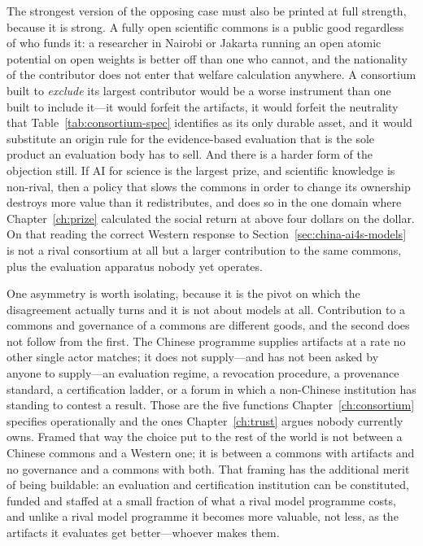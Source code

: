 The strongest version of the opposing case must also be printed at full strength, because it is strong. A fully open scientific commons is a public good regardless of who funds it: a researcher in Nairobi or Jakarta running an open atomic potential on open weights is better off than one who cannot, and the nationality of the contributor does not enter that welfare calculation anywhere. A consortium built to \emph{exclude} its largest contributor would be a worse instrument than one built to include it---it would forfeit the artifacts, it would forfeit the neutrality that Table~\ref{tab:consortium-spec} identifies as its only durable asset, and it would substitute an origin rule for the evidence-based evaluation that is the sole product an evaluation body has to sell. And there is a harder form of the objection still. If AI for science is the largest prize, and scientific knowledge is non-rival, then a policy that slows the commons in order to change its ownership destroys more value than it redistributes, and does so in the one domain where Chapter~\ref{ch:prize} calculated the social return at above four dollars on the dollar. On that reading the correct Western response to Section~\ref{sec:china-ai4s-models} is not a rival consortium at all but a larger contribution to the same commons, plus the evaluation apparatus nobody yet operates.

One asymmetry is worth isolating, because it is the pivot on which the disagreement actually turns and it is not about models at all. Contribution to a commons and governance of a commons are different goods, and the second does not follow from the first. The Chinese programme supplies artifacts at a rate no other single actor matches; it does not supply---and has not been asked by anyone to supply---an evaluation regime, a revocation procedure, a provenance standard, a certification ladder, or a forum in which a non-Chinese institution has standing to contest a result. Those are the five functions Chapter~\ref{ch:consortium} specifies operationally and the ones Chapter~\ref{ch:trust} argues nobody currently owns. Framed that way the choice put to the rest of the world is not between a Chinese commons and a Western one; it is between a commons with artifacts and no governance and a commons with both. That framing has the additional merit of being buildable: an evaluation and certification institution can be constituted, funded and staffed at a small fraction of what a rival model programme costs, and unlike a rival model programme it becomes more valuable, not less, as the artifacts it evaluates get better---whoever makes them.

